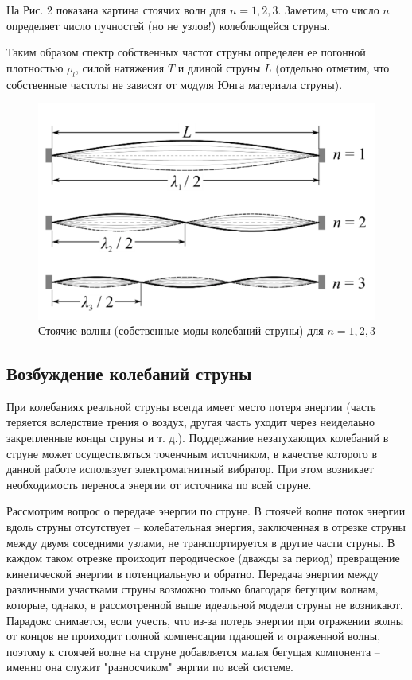 \documentclass[a4paper,12pt]{article} %
\begin{document}
На Рис. 2 показана картина стоячих волн для $n = 1, 2, 3$. Заметим, что число $n$ определяет число пучностей (но не узлов!) колеблющейся струны.

Таким образом спектр собственных частот струны определен ее погонной плотностью $\rho_l$, силой натяжения $T$ и длиной струны $L$ (отдельно отметим, что собственные частоты не зависят от модуля Юнга материала струны).
\begin{figure}[h]
\centering
\includegraphics[scale=0.5]{2}
\caption{Стоячие волны (собственные моды колебаний струны) для $n =1, 2, 3$}
\end{figure}
\subsection{Возбуждение колебаний струны}
При колебаниях реальной струны всегда имеет место потеря энергии (часть теряется вследствие трения о воздух, другая часть уходит через неиделаьно закрепленные концы струны и т. д.). Поддержание незатухающих колебаний в струне может осуществляться точенчным источником, в качестве которого в данной работе использует электромагнитный вибратор. При этом возникает необходимость переноса энергии от источника по всей струне.

Рассмотрим вопрос о передаче энергии по струне. В стоячей волне поток энергии вдоль струны отсутствует -- колебательная энергия, заключенная в отрезке струны между двумя соседними узлами, не транспортируется в другие части струны. В каждом таком отрезке проиходит перодическое (дважды за период) превращение кинетической энергии в потенциальную и обратно. Передача энергии между различными участками струны возможно только благодаря бегущим волнам, которые, однако, в рассмотренной выше идеальной модели струны не возникают. Парадокс снимается, если учесть, что из-за потерь энергии при отражении волны от концов не проиходит полной компенсации пдающей и отраженной волны, поэтому к стоячей волне на струне добавляется малая бегущая компонента -- именно она служит "разносчиком" энргии по всей системе. 
\end{document}

